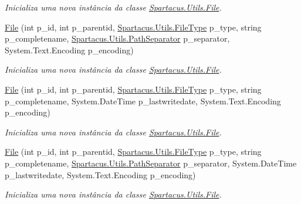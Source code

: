 \begin{DoxyCompactItemize}
\begin{DoxyCompactList}\small\item\em Inicializa uma nova instância da classe \hyperlink{classSpartacus_1_1Utils_1_1File}{Spartacus.\+Utils.\+File}. \end{DoxyCompactList}\item 
\hyperlink{classSpartacus_1_1Utils_1_1File_a0dde8a7041852d42f8a9f2b13c82287a}{File} (int p\+\_\+id, int p\+\_\+parentid, \hyperlink{namespaceSpartacus_1_1Utils_a2bc44488e88db523cb2dcffaa6e77541}{Spartacus.\+Utils.\+File\+Type} p\+\_\+type, string p\+\_\+completename, \hyperlink{namespaceSpartacus_1_1Utils_a9ee24558a33d60b42674bae3eed2a094}{Spartacus.\+Utils.\+Path\+Separator} p\+\_\+separator, System.\+Text.\+Encoding p\+\_\+encoding)
\begin{DoxyCompactList}\small\item\em Inicializa uma nova instância da classe \hyperlink{classSpartacus_1_1Utils_1_1File}{Spartacus.\+Utils.\+File}. \end{DoxyCompactList}\item 
\hyperlink{classSpartacus_1_1Utils_1_1File_a7192688295d058b68b609afe89719862}{File} (int p\+\_\+id, int p\+\_\+parentid, \hyperlink{namespaceSpartacus_1_1Utils_a2bc44488e88db523cb2dcffaa6e77541}{Spartacus.\+Utils.\+File\+Type} p\+\_\+type, string p\+\_\+completename, System.\+Date\+Time p\+\_\+lastwritedate, System.\+Text.\+Encoding p\+\_\+encoding)
\begin{DoxyCompactList}\small\item\em Inicializa uma nova instância da classe \hyperlink{classSpartacus_1_1Utils_1_1File}{Spartacus.\+Utils.\+File}. \end{DoxyCompactList}\item 
\hyperlink{classSpartacus_1_1Utils_1_1File_a01375f1f7ffd341af4ee2f32ebfdc71c}{File} (int p\+\_\+id, int p\+\_\+parentid, \hyperlink{namespaceSpartacus_1_1Utils_a2bc44488e88db523cb2dcffaa6e77541}{Spartacus.\+Utils.\+File\+Type} p\+\_\+type, string p\+\_\+completename, \hyperlink{namespaceSpartacus_1_1Utils_a9ee24558a33d60b42674bae3eed2a094}{Spartacus.\+Utils.\+Path\+Separator} p\+\_\+separator, System.\+Date\+Time p\+\_\+lastwritedate, System.\+Text.\+Encoding p\+\_\+encoding)
\begin{DoxyCompactList}\small\item\em Inicializa uma nova instância da classe \hyperlink{classSpartacus_1_1Utils_1_1File}{Spartacus.\+Utils.\+File}. \end{DoxyCompactList}\item 

\end{DoxyCompactItemize}
